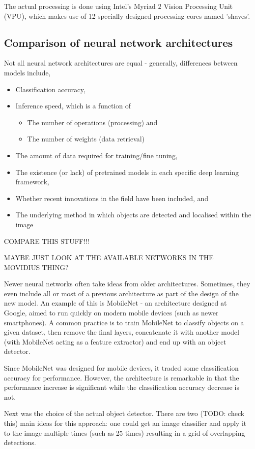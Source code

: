 The actual processing is done using Intel's Myriad 2 Vision Processing Unit (VPU), which makes use of 12 specially designed processing cores named 'shaves'.



\subsection{Comparison of neural network architectures}
Not all neural network architectures are equal - generally, differences between models include,

\begin{itemize}
	\item Classification accuracy,
	\item Inference speed, which is a function of
	\begin{itemize}
		\item The number of operations (processing) and
		\item The number of weights (data retrieval)
	\end{itemize}
	\item The amount of data required for training/fine tuning,
	\item The existence (or lack) of pretrained models in each specific deep learning framework,
	\item Whether recent innovations in the field have been included, and
	\item The underlying method in which objects are detected and localised within the image
\end{itemize}

{\Large \color{red} COMPARE THIS STUFF!!! }

{\Large \color{red} MAYBE JUST LOOK AT THE AVAILABLE NETWORKS IN THE MOVIDIUS THING?}

Newer neural networks often take ideas from older architectures. Sometimes, they even include all or most of a previous architecture as part of the design of the new model. An example of this is MobileNet - an architecture designed at Google, aimed to run quickly on modern mobile devices (such as newer smartphones). A common practice is to train MobileNet to classify objects on a given dataset, then remove the final layers, concatenate it with another model (with MobileNet acting as a feature extractor) and end up with an object detector.

Since MobileNet was designed for mobile devices, it traded some classification accuracy for performance. However, the architecture is remarkable in that the performance increase is significant while the classification accuracy decrease is not.

Next was the choice of the actual object detector. There are two (TODO: check this) main ideas for this approach: one could get an image classifier and apply it to the image multiple times (such as 25 times) resulting in a grid of overlapping detections.
